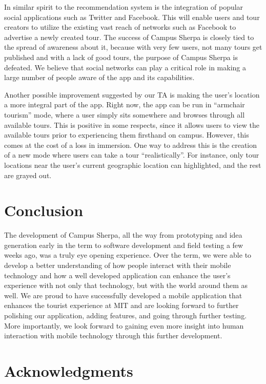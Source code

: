 \documentclass{sigchi}
\begin{document}
In similar spirit to the recommendation system is the integration of popular social applications such as Twitter and Facebook. This will enable users and tour creators to utilize the existing vast reach of networks such as Facebook to advertise a newly created tour. The success of Campus Sherpa is closely tied to the spread of awareness about it, because with very few users, not many tours get published and with a lack of good tours, the purpose of Campus Sherpa is defeated. We believe that social networks can play a critical role in making a large number of people aware of the app and its capabilities. 

Another possible improvement suggested by our TA is making the user's location a more integral part of the app. Right now, the app can be run in ``armchair tourism'' mode, where a user simply sits somewhere and browses through all available tours. This is positive in some respects, since it allows users to view the available tours prior to experiencing them firsthand on campus. However, this comes at the cost of a loss in immersion. One way to address this is the creation of a new mode where users can take a tour ``realistically''. For instance, only tour locations near the user's current geographic location can highlighted, and the rest are grayed out. 

\section{Conclusion}

The development of Campus Sherpa, all the way from prototyping and idea generation early in the term to software development and field testing a few weeks ago, was a truly eye opening experience. Over the term, we were able to develop a better understanding of how people interact with their mobile technology and how a well developed application can enhance the user's experience with not only that technology, but with the world around them as well. We are proud to have successfully developed a mobile application that enhances the tourist experience at MIT and are looking forward to further polishing our application, adding features, and going through further testing. More importantly, we look forward to gaining even more insight into human interaction with mobile technology through this further development. 



\section{Acknowledgments}
\end{document}
